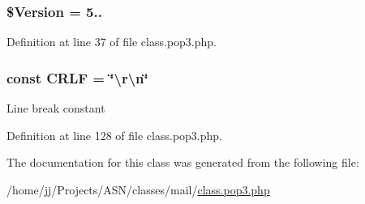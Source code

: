 \subsubsection[{\texorpdfstring{\$\+Version}{$Version}}]{\setlength{\rightskip}{0pt plus 5cm}\$Version = \textquotesingle{}5..\textquotesingle{}}\hypertarget{class_p_o_p3_a8a43e1c8b245951155d04b279276af95}{}\label{class_p_o_p3_a8a43e1c8b245951155d04b279276af95}


Definition at line 37 of file class.\+pop3.\+php.

\subsubsection[{\texorpdfstring{C\+R\+LF}{CRLF}}]{\setlength{\rightskip}{0pt plus 5cm}const C\+R\+LF = \char`\"{}\textbackslash{}r\textbackslash{}n\char`\"{}}\hypertarget{class_p_o_p3_aa8bdd4d85e1ba0db8c09f92688c27ca6}{}\label{class_p_o_p3_aa8bdd4d85e1ba0db8c09f92688c27ca6}
Line break constant 

Definition at line 128 of file class.\+pop3.\+php.



The documentation for this class was generated from the following file\+:\begin{DoxyCompactItemize}
\item 
/home/jj/\+Projects/\+A\+S\+N/classes/mail/\hyperlink{class_8pop3_8php}{class.\+pop3.\+php}\end{DoxyCompactItemize}
